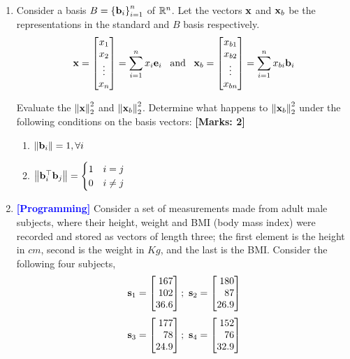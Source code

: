 \documentclass[12pt]{article}
\def\mf{\ensuremath\mathbf}
\def\mb{\ensuremath\mathbb}
\begin{document}
\begin{enumerate}
    \item Consider a basis $B = \left\{\mf{b}_i\right\}_{i=1}^{n}$ of $\mb{R}^n$. Let the vectors $\mf{x}$ and $\mf{x}_b$ be the representations in the standard and $B$ basis respectively. 
    \[ \mf{x} = \begin{bmatrix*}x_1\\x_2\\\vdots\\x_n\end{bmatrix*} = \sum_{i=1}^{n}x_i\mf{e}_i \,\,\,\,\, \text{and} \,\,\,\,\, \mf{x}_b =  \begin{bmatrix*}x_{b1}\\x_{b2}\\\vdots\\x_{bn}\end{bmatrix*} = \sum_{i=1}^{n}x_{bi}\mf{b}_i \]

    Evaluate the $\left\lVert \mf{x}\right\rVert_2^2$ and $\left\lVert \mf{x}_b\right\rVert_2^2$. Determine what happens to $\left\lVert \mf{x}_b\right\rVert_2^2$ under the following conditions on the basis vectors: \textbf{[Marks: 2]}
    \begin{enumerate}
        \item $\left\lVert \mf{b}_i\right\rVert = 1, \forall i$
        \item $\left\lVert \mf{b}_i^\top\mf{b}_j\right\rVert = \begin{cases}
        1 & i = j\\
        0 & i \neq j
        \end{cases}$
    \end{enumerate}

    \item \textcolor{blue}{\textbf{[Programming]}} Consider a set of measurements made from adult male subjects, where their height, weight and BMI (body mass index) were recorded and stored as vectors of length three; the first element is the height in $cm$, second is the weight in $Kg$, and the last is the BMI. Consider the following four subjects,
    \[ \mf{s}_1 =  \begin{bmatrix*}[r]167\\102\\36.6\end{bmatrix*}; \,\,
    \mf{s}_2 =  \begin{bmatrix*}[r]180\\87\\26.9\end{bmatrix*} \]
    \[ \mf{s}_3 =  \begin{bmatrix*}[r]177\\78\\24.9\end{bmatrix*}; \,\,
    \mf{s}_4 =  \begin{bmatrix*}[r]152\\76\\32.9\end{bmatrix*} \]


\end{enumerate}
\end{document}
